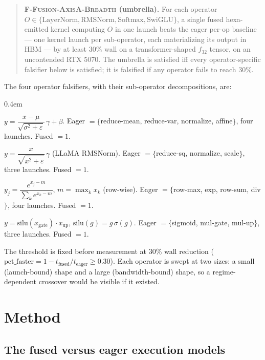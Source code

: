 \documentclass[11pt,a4paper]{article}
\newcommand{\falb}{\textsc{F-Fusion-AxisA-Breadth}}
\newcommand{\fln}{\textsc{F-Fusion-AxisA-LayerNorm}}
\newcommand{\frms}{\textsc{F-Fusion-AxisA-RMSNorm}}
\newcommand{\fsm}{\textsc{F-Fusion-AxisA-Softmax}}
\newcommand{\fswi}{\textsc{F-Fusion-AxisA-SwiGLU}}
\begin{document}
\begin{quote}
\textbf{\falb{} (umbrella).} For each operator
$O\in\{\text{LayerNorm},\text{RMSNorm},\text{Softmax},\text{SwiGLU}\}$, a single
fused hexa-emitted kernel computing $O$ in one launch beats the eager per-op
baseline --- one kernel launch per sub-operator, each materializing its output
in HBM --- by at least $30\%$ wall on a transformer-shaped $f_{32}$ tensor, on
an uncontended RTX 5070. The umbrella is satisfied iff every operator-specific
falsifier below is satisfied; it is falsified if any operator fails to reach
$30\%$.
\end{quote}

The four operator falsifiers, with their sub-operator decompositions, are:

\begin{description}\itemsep0.4em
\item[\fln] $y = \dfrac{x-\mu}{\sqrt{\sigma^2+\varepsilon}}\,\gamma + \beta$.
  Eager $=\{$reduce-mean, reduce-var, normalize, affine$\}$, four launches.
  Fused $= 1$.
\item[\frms] $y = \dfrac{x}{\sqrt{\overline{x^2}+\varepsilon}}\,\gamma$
  (LLaMA RMSNorm). Eager $=\{$reduce-sq, normalize, scale$\}$, three launches.
  Fused $= 1$.
\item[\fsm] $y_j = \dfrac{e^{x_j-m}}{\sum_k e^{x_k-m}}$, $m=\max_k x_k$
  (row-wise). Eager $=\{$row-max, exp, row-sum, div$\}$, four launches.
  Fused $= 1$.
\item[\fswi]
  $y = \mathrm{silu}(x_{\text{gate}})\cdot x_{\text{up}}$,
  $\mathrm{silu}(g)=g\,\sigma(g)$. Eager $=\{$sigmoid, mul-gate, mul-up$\}$,
  three launches. Fused $= 1$.
\end{description}

The threshold is fixed before measurement at $30\%$ wall reduction
($\text{pct\_faster} = 1 - t_{\text{fused}}/t_{\text{eager}} \ge 0.30$). Each
operator is swept at two sizes: a small (launch-bound) shape and a large
(bandwidth-bound) shape, so a regime-dependent crossover would be visible if it
existed.

\section{Method}
\label{sec:method}

\subsection{The fused versus eager execution models}
\end{document}
